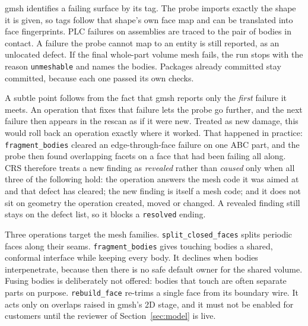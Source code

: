 \documentclass[11pt,onecolumn]{article}
\newcommand{\code}[1]{\texttt{\small #1}}
\begin{document}
gmsh identifies a failing surface by its tag. The probe imports exactly the shape it is given, so
tags follow that shape's own face map and can be translated into face fingerprints. PLC failures on
assemblies are traced to the pair of bodies in contact. A failure the probe cannot map to an entity
is still reported, as an unlocated defect. If the final whole-part volume mesh fails, the run stops
with the reason \code{unmeshable} and names the bodies. Packages already committed stay committed,
because each one passed its own checks.

A subtle point follows from the fact that gmsh reports only the \emph{first} failure it meets. An
operation that fixes that failure lets the probe go further, and the next failure then appears in
the rescan as if it were new. Treated as new damage, this would roll back an operation exactly where
it worked. That happened in practice: \code{fragment\_bodies} cleared an edge-through-face failure
on one ABC part, and the probe then found overlapping facets on a face that had been failing all
along. CRS therefore treats a new finding as \emph{revealed} rather than \emph{caused} only when all
three of the following hold: the operation answers the mesh code it was aimed at and that defect has
cleared; the new finding is itself a mesh code; and it does not sit on geometry the operation
created, moved or changed. A revealed finding still stays on the defect list, so it blocks a
\code{resolved} ending.

Three operations target the mesh families. \code{split\_closed\_faces} splits periodic faces along
their seams. \code{fragment\_bodies} gives touching bodies a shared, conformal interface while
keeping every body. It declines when bodies interpenetrate, because then there is no safe default
owner for the shared volume. Fusing bodies is deliberately not offered: bodies that touch are often
separate parts on purpose. \code{rebuild\_face} re-trims a single face from its boundary wire. It
acts only on overlaps raised in gmsh's 2D stage, and it must not be enabled for customers until the
reviewer of Section~\ref{sec:model} is live.
\end{document}

